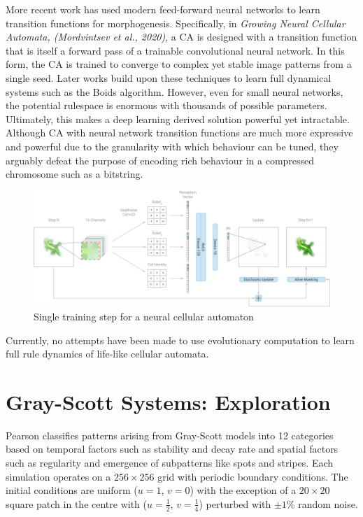More recent work has used modern feed-forward neural networks to learn transition functions for morphogenesis. Specifically, in \textit{Growing Neural Cellular Automata, (Mordvintsev et al., 2020)}\cite{mordvintsev2020growing}, a CA is designed with a transition function that is itself a forward pass of a trainable convolutional neural network. In this form, the CA is trained to converge to complex yet stable image patterns from a single seed. Later works build upon these techniques to learn full dynamical systems such as the Boids algorithm\cite{grattarola2021learning}. However, even for small neural networks, the potential rulespace is enormous with thousands of possible parameters. Ultimately, this makes a deep learning derived solution powerful yet intractable. Although CA with neural network transition functions are much more expressive and powerful due to the granularity with which behaviour can be tuned, they arguably defeat the purpose of encoding rich behaviour in a compressed chromosome such as a bitstring.\\

\begin{figure}[!h]
\centering
\includegraphics[width=\textwidth]{images/nca.png}
\caption{Single training step for a neural cellular automaton\cite{mordvintsev2020growing}}
\label{fig:nca}
\end{figure}

Currently, no attempts have been made to use evolutionary computation to learn full rule dynamics of life-like cellular automata.

\section{Gray-Scott Systems: Exploration} \label{sec: gs-exploration}

Pearson\cite{pearson1993complex} classifies patterns arising from Gray-Scott models into 12 categories based on temporal factors such as stability and decay rate and spatial factors such as regularity and emergence of subpatterns like spots and stripes. Each simulation operates on a $256 \times 256$ grid with periodic boundary conditions. The initial conditions are uniform ($u = 1$, $v = 0$) with the exception of a $20 \times 20$ square patch in the centre with ($u=\frac{1}{2}$, $v=\frac{1}{4}$) perturbed with $\pm 1\%$ random noise.\\

